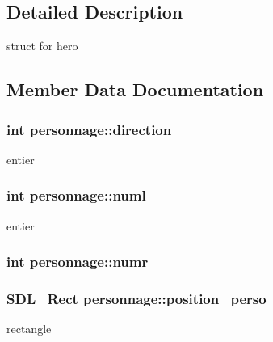 \subsection{Detailed Description}
struct for hero 

\subsection{Member Data Documentation}
\subsubsection[{\texorpdfstring{direction}{direction}}]{\setlength{\rightskip}{0pt plus 5cm}int personnage\+::direction}\hypertarget{structpersonnage_a2664acffa6fccd8487b9e03b63fbd6da}{}\label{structpersonnage_a2664acffa6fccd8487b9e03b63fbd6da}
entier 
\subsubsection[{\texorpdfstring{numl}{numl}}]{\setlength{\rightskip}{0pt plus 5cm}int personnage\+::numl}\hypertarget{structpersonnage_acac339d614a7ac8e987bc94d547d9e18}{}\label{structpersonnage_acac339d614a7ac8e987bc94d547d9e18}
entier 
\subsubsection[{\texorpdfstring{numr}{numr}}]{\setlength{\rightskip}{0pt plus 5cm}int personnage\+::numr}\hypertarget{structpersonnage_a65b13e52d4bab27bc25e35de373fa865}{}\label{structpersonnage_a65b13e52d4bab27bc25e35de373fa865}
\subsubsection[{\texorpdfstring{position\+\_\+perso}{position_perso}}]{\setlength{\rightskip}{0pt plus 5cm}S\+D\+L\+\_\+\+Rect personnage\+::position\+\_\+perso}\hypertarget{structpersonnage_a4a45c9e4310d819fcd3c9a60fc8c0ebf}{}\label{structpersonnage_a4a45c9e4310d819fcd3c9a60fc8c0ebf}
rectangle 
